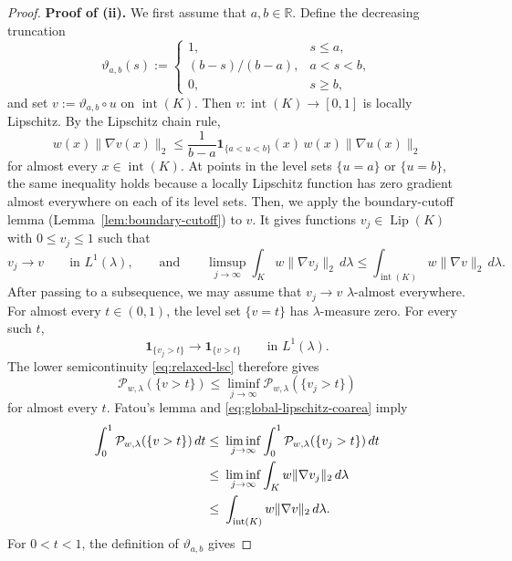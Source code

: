 \documentclass[11pt]{article}
\theoremstyle{definition}
\theoremstyle{remark}
\begin{document}
\begin{proof}
\textbf{Proof of \textup{(ii)}.}
We first assume that \(a,b\in\mathbb R\).  Define the decreasing
truncation
\[
 \vartheta_{a,b}(s)
 :=
 \begin{cases}
 1, & s\le a,\\[1mm]
 (b-s)/(b-a), & a<s<b,\\[1mm]
 0, & s\ge b,
 \end{cases}
\]
and set $v:=\vartheta_{a,b}\circ u$ on $\operatorname{int}(K)$. Then \(v:\operatorname{int}(K)\to[0,1]\) is locally Lipschitz.  By the Lipschitz chain
rule,
\begin{equation}\label{eq:truncated-u-gradient}
 w(x)\|\nabla v(x)\|_2
 \le
 \frac{1}{b-a}
 \mathbf1_{\{a<u<b\}}(x)\,
 w(x)\|\nabla u(x)\|_2
\end{equation}
for almost every \(x\in\operatorname{int}(K)\).  At points in the level sets
\(\{u=a\}\) or \(\{u=b\}\), the same inequality holds because a locally
Lipschitz function has zero gradient almost everywhere on each of its
level sets. Then, we apply the boundary-cutoff lemma (Lemma~\ref{lem:boundary-cutoff}) to \(v\).  It gives functions
\(v_j\in\operatorname{Lip}(K)\) with \(0\le v_j\le1\) such that
\begin{equation}\label{eq:truncation-recovery-energy}
 v_j\longrightarrow v
 \qquad\text{in }L^1(\lambda),\qquad \text{and}\qquad 
 \limsup_{j\to\infty}
 \int_Kw\|\nabla v_j\|_2\,d\lambda
 \le
 \int_{\operatorname{int}(K)} w\|\nabla v\|_2\,d\lambda.
\end{equation}
After passing to a subsequence, we may assume that \(v_j\to v\)
\(\lambda\)-almost everywhere.  For almost every \(t\in(0,1)\), the level
set \(\{v=t\}\) has \(\lambda\)-measure zero.  For every such \(t\),
\[
 \mathbf1_{\{v_j>t\}}
 \longrightarrow
 \mathbf1_{\{v>t\}}
 \qquad\text{in }L^1(\lambda).
\]
The lower semicontinuity
\eqref{eq:relaxed-lsc} therefore gives
\[
 \mathcal P_{w,\lambda}(\{v>t\})
 \le
 \liminf_{j\to\infty}
 \mathcal P_{w,\lambda}(\{v_j>t\})
\]
for almost every \(t\).  Fatou's lemma and
\eqref{eq:global-lipschitz-coarea} imply
\begin{align}
 \int_0^1\mathcal P_{w,\lambda}(\{v>t\})\,dt
 \le &~ 
 \liminf_{j\to\infty}
 \int_0^1\mathcal P_{w,\lambda}(\{v_j>t\})\,dt \notag\\
 \le &~ 
 \liminf_{j\to\infty}
 \int_Kw\|\nabla v_j\|_2\,d\lambda \notag\\
 \le &~ 
 \int_{\operatorname{int}(K)} w\|\nabla v\|_2\,d\lambda.
 \label{eq:coarea-after-cutoff}
\end{align}
For \(0<t<1\), the definition of \(\vartheta_{a,b}\) gives

\end{proof}
\end{document}
